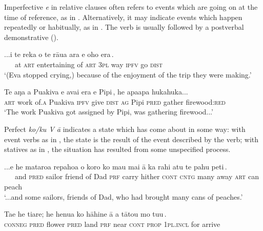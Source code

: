 Imperfective \textit{e} in relative clauses often refers to events which are going on at the time of reference, as in . Alternatively, it may indicate events which happen repeatedly or habitually, as in . The verb is usually followed by a postverbal demonstrative ().

\ea\label{ex:11.113}
\gll ...{\ꞌ}i te reka o te rāua ara {\ob}e oho era\,{\cb}. \\
~~~at \textsc{art} entertaining of \textsc{art} \textsc{3pl} way {\db}\textsc{ipfv} go \textsc{dist} \\

\glt 
‘(Eva stopped crying,) because of the enjoyment of the trip they were making.’ \textstyleExampleref{[R210.137]} 
\z

\ea\label{ex:11.114}
\gll Te aŋa {\ꞌ}a Puakiva {\ob}e {\ꞌ}avai era e Pipi\,{\cb}, he apaapa hukahuka... \\
\textsc{art} work of\textsc{.a} Puakiva {\db}\textsc{ipfv} give \textsc{dist} \textsc{ag} Pipi \textsc{pred} gather firewood:\textsc{red} \\

\glt 
‘The work Puakiva got assigned by Pipi, was gathering firewood...’ \textstyleExampleref{[R229.396]} 
\z

Perfect \textit{ko/ku V {\ꞌ}ā} indicates a state which has come about in some way: with event verbs as in , the state is the result of the event described by the verb; with statives as in , the situation has resulted from some unspecified process.

\ea\label{ex:11.115}
\gll ...{\ꞌ}e he mataroa repahoa o koro {\ob}ko ma{\ꞌ}u mai {\ꞌ}ā ka rahi atu  te pahu peti\,{\cb}.\\
~~~and \textsc{pred} sailor friend of Dad {\db}\textsc{prf} carry hither \textsc{cont} \textsc{cntg} many away  \textsc{art} can peach\\

\glt 
‘...and some sailors, friends of Dad, who had brought many cans of peaches.’ \textstyleExampleref{[R210.125]} 
\z

\ea\label{ex:11.116}
\gll Ta{\ꞌ}e he tiare; he henua {\ob}ko hāhine {\ꞌ}ā a tātou mo tu{\ꞌ}u\,{\cb}. \\
\textsc{conneg} \textsc{pred} flower \textsc{pred} land {\db}\textsc{prf} near \textsc{cont} \textsc{prop} \textsc{1pl.incl} for arrive \\

